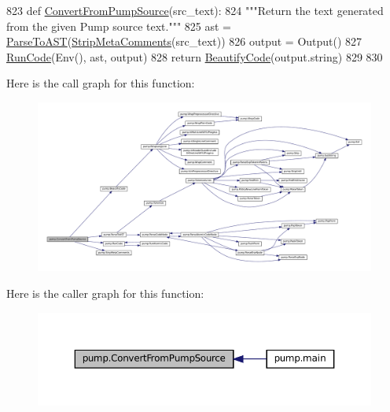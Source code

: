 \begin{DoxyCode}
823 \textcolor{keyword}{def }\hyperlink{namespacepump_a568fe53d1443489ac15bac4a0f9faf91}{ConvertFromPumpSource}(src\_text):
824   \textcolor{stringliteral}{"""Return the text generated from the given Pump source text."""}
825   ast = \hyperlink{namespacepump_a56ac10a83a3a875d305c9aae71fc0549}{ParseToAST}(\hyperlink{namespacepump_a8c50cb40d65f26771c6f51eb265bb569}{StripMetaComments}(src\_text))
826   output = Output()
827   \hyperlink{namespacepump_ac6a714a44e28c2a19a1dfabeb9c9d4f1}{RunCode}(Env(), ast, output)
828   \textcolor{keywordflow}{return} \hyperlink{namespacepump_a3456db8d85605892d670669c4e238cd7}{BeautifyCode}(output.string)
829 
830 
\end{DoxyCode}
Here is the call graph for this function\+:
\nopagebreak
\begin{figure}[H]
\begin{center}
\leavevmode
\includegraphics[width=350pt]{namespacepump_a568fe53d1443489ac15bac4a0f9faf91_cgraph}
\end{center}
\end{figure}
Here is the caller graph for this function\+:
\nopagebreak
\begin{figure}[H]
\begin{center}
\leavevmode
\includegraphics[width=350pt]{namespacepump_a568fe53d1443489ac15bac4a0f9faf91_icgraph}
\end{center}
\end{figure}
\mbox{\label{namespacepump_a38844b22bd5a51c098b07c2c36c5c5b3}} 
